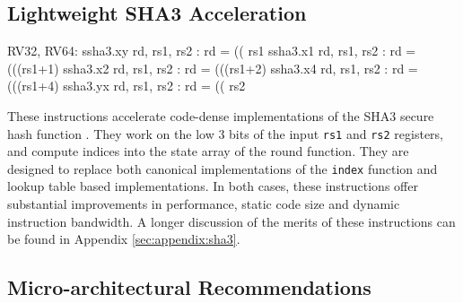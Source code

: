
\subsection{Lightweight SHA3 Acceleration}
\label{sec:scalar:sha3}

\begin{isa}
RV32, RV64:
    ssha3.xy rd, rs1, rs2 : rd = (( rs1    %
    ssha3.x1 rd, rs1, rs2 : rd = (((rs1+1) %
    ssha3.x2 rd, rs1, rs2 : rd = (((rs1+2) %
    ssha3.x4 rd, rs1, rs2 : rd = (((rs1+4) %
    ssha3.yx rd, rs1, rs2 : rd = (( rs2    %
\end{isa}

These instructions accelerate code-dense implementations of the SHA3 secure
hash function \cite{nist:fips:202}.
They work on the low $3$ bits of the input {\tt rs1} and {\tt rs2} registers,
and compute indices into the state array of the round function.
They are designed to replace both canonical implementations of the
{\tt index} function and lookup table based implementations.
In both cases, these instructions offer substantial
improvements in performance, static code size and dynamic instruction
bandwidth.
A longer discussion of the merits of these instructions can
be found in Appendix \ref{sec:appendix:sha3}.



\subsection{Micro-architectural Recommendations}



